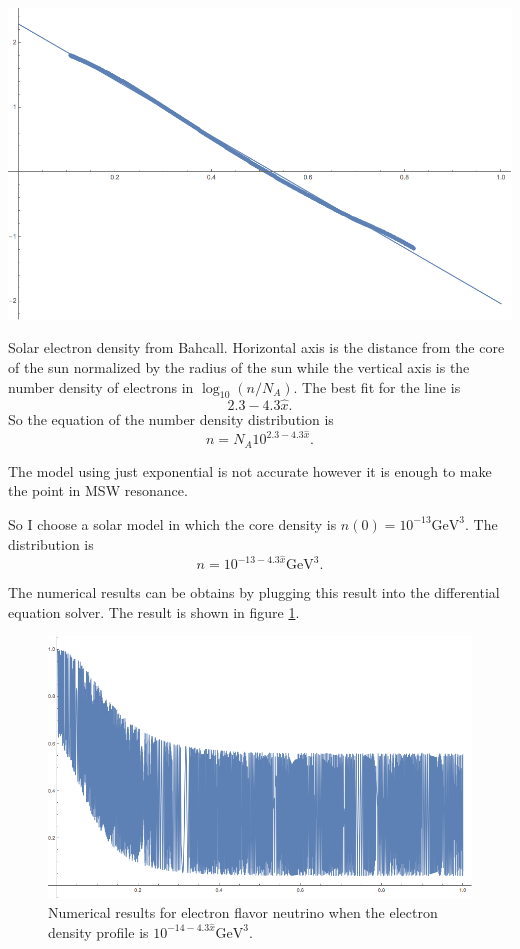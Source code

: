 \documentclass{tufte-handout}
\begin{document}
\begin{marginfigure}
\centering
\includegraphics{assets/solar-electron-dist}
\caption{Solar electron density from Bahcall. 
Horizontal axis is the distance from the core of the sun normalized by the radius of the sun while the vertical axis is the number density of electrons in $\log_{10}(n/N_A)$.
The best fit for the line is 
$$ 2.3-4.3 \hat x .$$
So the equation of the number density distribution is
$$n = N_A 10^{2.3 - 4.3\hat x } .$$ }
\label{fig:solar-electron-dist}
\end{marginfigure}

The model using just exponential is not accurate however it is enough to make the point in MSW resonance.

So I choose a solar model in which the core density is $n(0) = 10^{-13}\mathrm{GeV}^{3}$. The distribution is \begin{equation*}
n =  10^{-13 - 4.3\hat x} \mathrm{GeV}^{3}.
\end{equation*}


The numerical results can be obtains by plugging this result into the differential equation solver. The result is shown in figure \ref{fig:numMSW-model-1}.



\begin{figure}
\centering
\includegraphics{assets/numMSW-model-1}
\caption{Numerical results for electron flavor neutrino when the electron density profile is $10^{-14 - 4.3\hat x} \mathrm{GeV}^{3}$.}
\label{fig:numMSW-model-1}
\end{figure}
\end{document}
